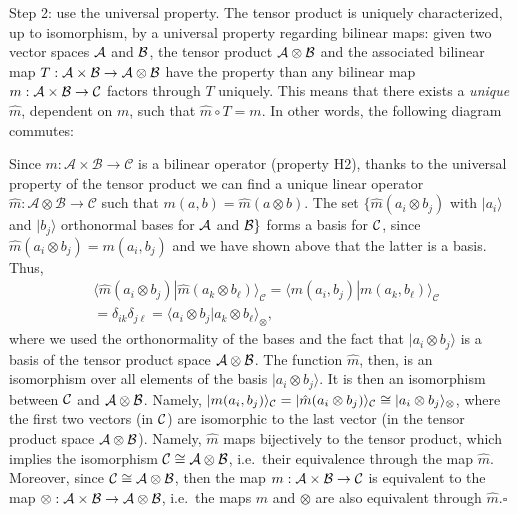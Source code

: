 \documentclass[aps,prl,amsmath,amssymb,twocolumn,nofootinbib]{revtex4}
\theoremstyle{plain}
\theoremstyle{definition}
\theoremstyle{remark}
\def\>{\rangle}
\def\<{\langle}
\def\labell#1{\label{#1}}
\begin{document}
Step 2: use the universal property. The tensor product is uniquely
characterized, up to isomorphism, by a universal property regarding
bilinear maps: given two vector spaces $\cal A$ and $\cal B$, the
tensor product ${\cal A}\otimes{\cal B}$ and the associated bilinear
map $T : \cal A \times \cal B \to {\cal A}\otimes{\cal B}$ have the property
than any bilinear map $m:{\cal A}\times{\cal B}\to{\cal C}$ factors
through $T$ uniquely.  This means that there exists a {\em unique}
$\hat m$, dependent on $m$, such that $\hat m \circ T=m$.  In other
words, the following diagram commutes:
\begin{center}
\end{center}
Since $m : \mathcal{A} \times \mathcal{B} \to \mathcal{C}$ is
a bilinear operator (property H2), thanks to the universal property of
the tensor product we can find a unique linear operator $\hat{m} :
\mathcal{A} \otimes \mathcal{B} \to \mathcal{C}$ such that $m(a, b) =
\hat m(a \otimes b)$. The set $\{ \hat m(a_i\otimes b_j)$ with
$|a_i\>$ and $|b_j\>$ orthonormal bases for $\cal A$ and ${\cal B}\}$
forms a basis for $\cal C$, since $\hat m(a_i\otimes b_j)=m(a_i,b_j)$
and we have shown above that the latter is a basis.  Thus,
\begin{align} 
  &\<\hat m(a_i\otimes b_j)|\hat m(a_k\otimes b_\ell)
\>_{\mathcal{C}}=\<m(a_i,
  b_j)|m(a_k,b_\ell)\>_\mathcal{C} \nonumber\\& =
  \delta_{ik}\delta_{j\ell}
 = \<a_i\otimes
  b_j| a_k \otimes b_\ell\>_{\otimes},
\labell{ecco}\; 
\end{align}
where we used the orthonormality of the bases and the fact that
$|a_i\otimes b_j\>$ is a basis of the tensor product space ${\cal
  A}\otimes{\cal B}$. The function $\hat{m}$, then, is an isomorphism
over all elements of the basis $|a_i\otimes b_j\>$. It is then an
isomorphism between $\cal C$ and ${\cal A}\otimes{\cal B}$. Namely,
$|m(a_i,b_j)\>_{\cal C} = |\hat{m}(a_i\otimes b_j)\>_{\cal C} \cong
|a_i\otimes b_j\>_\otimes$, where the first two vectors (in $\cal C$)
are isomorphic to the last vector (in the tensor product space ${\cal
  A}\otimes{\cal B}$). Namely, $\hat{m}$ maps bijectively to the
tensor product, which implies the isomorphism ${\cal C}\cong{\cal
  A}\otimes{\cal B}$, i.e.~their equivalence through the map
$\hat{m}$. Moreover, since ${\cal C}\cong{\cal A}\otimes{\cal B}$,
then the map $m : \cal A \times \cal B \to \cal C$ is equivalent to
the map $\otimes : \cal A \times \cal B \to \cal A \otimes \cal B$,
i.e.~the maps $m$ and $\otimes$ are also equivalent through $\hat
m$.$\square$
\end{document}
